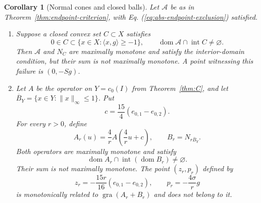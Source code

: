 \documentclass[11pt]{article}
\newcommand{\gra}{\operatorname{gra}}
\newcommand{\dom}{\operatorname{dom}}
\newcommand{\pair}[2]{\langle #1,#2\rangle}
\newtheorem{corollary}{Corollary}
\theoremstyle{definition}
\theoremstyle{remark}
\begin{document}
\begin{corollary}[Normal cones and closed balls]
\label{cor:normal-cone}
Let $\mathcal A$ be as in Theorem~\ref{thm:endpoint-criterion}, with Eq. (\ref{eq:abs-endpoint-exclusion}) satisfied.
\begin{enumerate}
\item\label{cor:nc-general} Suppose a closed convex set $C\subset X$ satisfies
\begin{equation}
0\in C\subset\{x\in X:\pair{x}{g}\ge-1\},
\qquad
\dom\mathcal A\cap\operatorname{int}C\ne\varnothing.
\label{eq:cor-nc-condition}
\end{equation}
Then $\mathcal A$ and $N_C$ are maximally monotone and satisfy the interior-domain condition, but their sum is not maximally monotone. A point witnessing this failure is $(0,-Sg)$.
\item\label{cor:nc-ball} Let $A$ be the operator on $Y=c_0(I)$ from Theorem~\ref{thm:C}, and let $\overline B_Y=\{x\in Y:\|x\|_\infty\le1\}$. Put
\[
c=\frac{15}{4}(e_{0,1}-e_{0,2}).
\]
For every $r>0$, define
\begin{equation}
A_r(u)=\frac4r A\left(\frac4r u+c\right),
\qquad B_r=N_{r\overline B_Y}.
\label{eq:cor-ball-operators}
\end{equation}
Both operators are maximally monotone and satisfy
\[
\dom A_r\cap\operatorname{int}(\dom B_r)\ne\varnothing.
\]
Their sum is not maximally monotone. The point $(z_r,p_r)$ defined by
\begin{equation}
z_r=-\frac{15r}{16}(e_{0,1}-e_{0,2}),
\qquad p_r=-\frac{4\sigma}{r}g
\label{eq:cor-ball-witness}
\end{equation}
is monotonically related to $\gra(A_r+B_r)$ and does not belong to it.
\end{enumerate}
\end{corollary}
\end{document}
